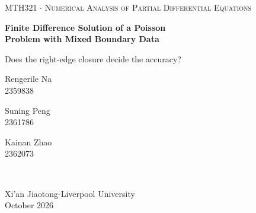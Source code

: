 \documentclass[aspectratio=43]{beamer}
\begin{document}
\newcommand{\member}[2]{\parbox[t]{3.3cm}{\centering\small #1\\[1pt]{\scriptsize\color{black!55} #2}}}
\begin{frame}
\centering
\vfill
{\scriptsize\color{black!55}\textsc{MTH321 \;$\cdot$\; Numerical Analysis of Partial Differential Equations}\par}
\vskip14pt
{\color{rblue}\Large\bfseries Finite Difference Solution of a Poisson\\[3pt] Problem with Mixed Boundary Data\par}
\vskip6pt
{\small\color{black!70} Does the right-edge closure decide the accuracy?\par}
\vskip24pt
\member{Rengerile Na}{2359838}\hspace{0.3cm}\member{Suning Peng}{2361786}\hspace{0.3cm}\member{Kainan Zhao}{2362073}\\[8pt]

\vspace{15pt}
\vfill
{\footnotesize\color{black!70} Xi'an Jiaotong-Liverpool University\\[2pt]
\scriptsize October 2026\par}
\vfill
\end{frame}

\end{document}
